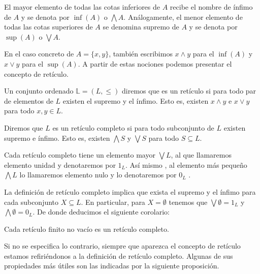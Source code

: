 \documentclass[oneside,openright,titlepage,numbers=noenddot,openany,headinclude,footinclude=true,
cleardoublepage=empty,abstractoff,BCOR=5mm,paper=a4,fontsize=12pt,main=spanish]{scrreprt}
\begin{document}
\begin{definition} El mayor elemento de todas las cotas inferiores de $A$ recibe el nombre de ínfimo de $A$ y se denota por $\inf(A)$ o $\bigwedge A$. Análogamente, el menor elemento de todas las cotas superiores de $A$ se denomina supremo de $A$ y se denota por $\sup(A)$ o $\bigvee A$. 
\end{definition}
 

En el caso concreto de $ A=\{x,y\}$, también escribimos $x \wedge y$ para el $\inf(A)$ y $x \vee y $ para el $\sup(A)$. A partir de estas nociones podemos presentar el concepto de retículo.

\begin{definition} Un conjunto ordenado $\mathbb{L} = (L,\leq)$  diremos que es un retículo si para todo par de elementos de $L$ existen el supremo y el ínfimo. Esto es, existen $x \wedge y$ e $x \vee y$ para todo $x,y \in L$.

\end{definition}

\begin{definition} Diremos que $L$ es un retículo completo si para todo subconjunto de $L$ existen supremo e ínfimo. Esto es,  existen $\bigwedge S$ y $\bigvee S$ para todo $S \subseteq L$.
\end{definition}

Cada retículo completo tiene un elemento mayor $\bigvee L$, al que llamaremos elemento unidad y denotaremos por \textbf{$1$}$_L$. Así mismo , al elemento más pequeño $\bigwedge L$ lo llamaremos elemento nulo y lo denotaremos por \textbf{$0$}$_L$ .

La definición de retículo completo implica que exista el supremo y el ínfimo para cada subconjunto $X\subseteq L$. En particular, para $X=\emptyset$ tenemos que $\bigvee \emptyset = $\textbf{$1$}$_L$ y $\bigwedge \emptyset =$\textbf{$0$}$_L$. De donde deducimos el siguiente corolario:

\begin{corollary}\cite{introduction_lattices}
Cada retículo finito no vacío es un retículo completo.
\end{corollary}

Si no se especifica lo contrario, siempre que aparezca el concepto de retículo estamos refiriéndonos a la definición de retículo completo. Algunas de sus propiedades más útiles son las indicadas por la siguiente proposición.
\end{document}
